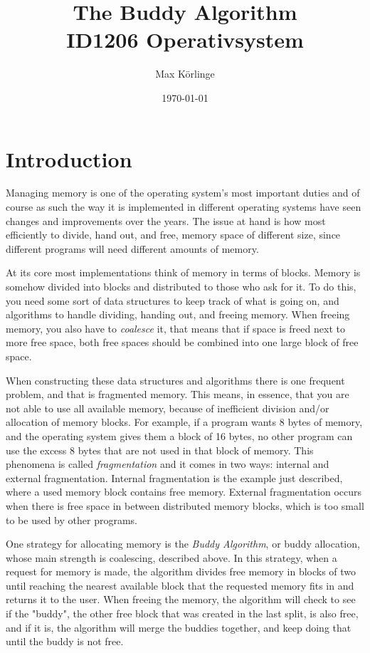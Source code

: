 \documentclass{article}
\begin{document}
\title{\vspace{-3.0cm}The Buddy Algorithm \\
\medskip
\large
ID1206 Operativsystem }
\author{Max Körlinge}
\date{\today}
\maketitle


\section{Introduction}

Managing memory is one of the operating system's most important duties and of course as such the way it is implemented in different operating systems have seen changes and improvements over the years. The issue at hand is how most efficiently to divide, hand out, and free, memory space of different size, since different programs will need different amounts of memory.

At its core most implementations think of memory in terms of blocks. Memory is somehow divided into blocks and distributed to those who ask for it. To do this, you need some sort of data structures to keep track of what is going on, and algorithms to handle dividing, handing out, and freeing memory. When freeing memory, you also have to \textit{coalesce} it, that means that if space is freed next to more free space, both free spaces should be combined into one large block of free space.

When constructing these data structures and algorithms there is one frequent problem, and that is fragmented memory. This means, in essence, that you are not able to use all available memory, because of inefficient division and/or allocation of memory blocks. For example, if a program wants 8 bytes of memory, and the operating system gives them a block of 16 bytes, no other program can use the excess 8 bytes that are not used in that block of memory. This phenomena is called \textit{fragmentation} and it comes in two ways: internal and external fragmentation. Internal fragmentation is the example just described, where a used memory block contains free memory. External fragmentation occurs when there is free space in between distributed memory blocks, which is too small to be used by other programs.

One strategy for allocating memory is the \textit{Buddy Algorithm}, or buddy allocation, whose main strength is coalescing, described above. In this strategy, when a request for memory is made, the algorithm divides free memory in blocks of two until reaching the nearest available block that the requested memory fits in and returns it to the user. When freeing the memory, the algorithm will check to see if the "buddy", the other free block that was created in the last split, is also free, and if it is, the algorithm will merge the buddies together, and keep doing that until the buddy is not free.
\end{document}
